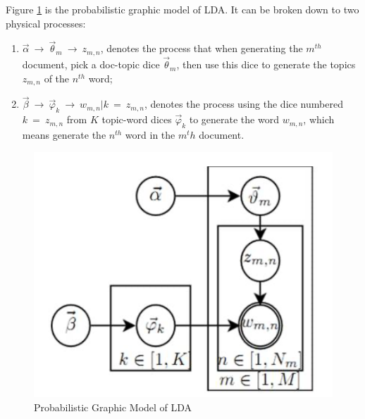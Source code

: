

Figure \ref{fig:6} is the probabilistic graphic model of LDA. It can be broken down to two physical processes:

\begin{enumerate}
    \item $\vec \alpha\ \rightarrow\ \vec \theta_m\ \rightarrow\ z_{m,n}$, denotes the process that when generating the $m^{th}$ document, pick a doc-topic dice $\vec \theta_m$, then use this dice to generate the topics $z_{m,n}$ of the $n^{th}$ word;
    
    \item $\vec \beta\ \rightarrow\ \vec\varphi_k\ \rightarrow\ w_{m,n}|k\ =\ z_{m,n}$, denotes the process using the dice numbered $k\ =\ z_{m,n}$ from $K$ topic-word dices $\vec \varphi_k$ to generate the word $w_{m,n}$, which means generate the $n^{th}$ word in the $m^th$ document.
\end{enumerate}

\begin{figure}[H]
    \centering
    \includegraphics[scale=0.8]{images/graph_lda.png}
    \caption{Probabilistic Graphic Model of LDA \cite{jin_2013}}
    \label{fig:6}
\end{figure}

